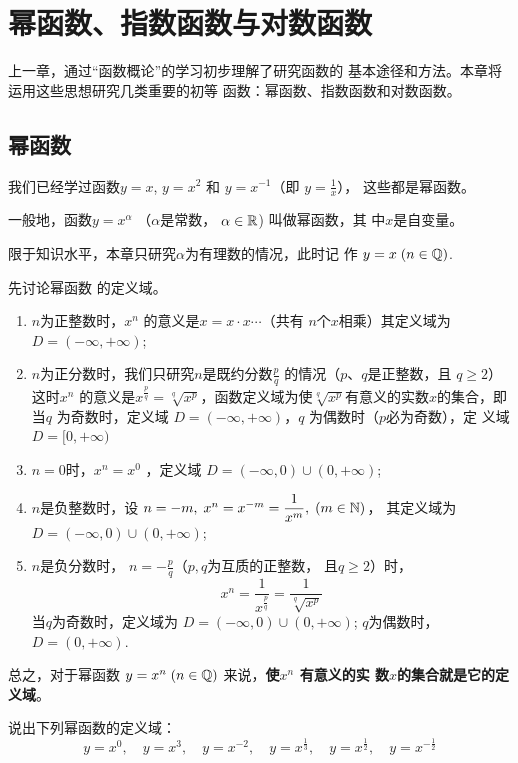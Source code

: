 \chapter{幂函数、指数函数与对数函数}
上一章，通过“函数概论”的学习初步理解了研究函数的
基本途径和方法。本章将运用这些思想研究几类重要的初等
函数：幂函数、指数函数和对数函数。

\section{幂函数}
我们已经学过函数$y=x$, 
$y=x^2$
和
$y=x^{-1}$（即
$y=\frac{1}{x}$），
这些都是幂函数。

一般地，函数$y=x^{\alpha}$
（$\alpha$是常数，
$\alpha\in\mathbb{R}$)
叫做幂函数，其
中$x$是自变量。

限于知识水平，本章只研究$\alpha$为有理数的情况，此时记
作
$y=x\; (n\in \mathbb{Q})$.

先讨论幂函数
的定义域。

\begin{enumerate}[(1)]
    \item $n$为正整数时，$x^n$
的意义是$x=x\cdot x\cdots$（共有
$n$个$x$相乘）其定义域为
$D=(-\infty,+\infty)$;
\item $n$为正分数时，我们只研究$n$是既约分数$\frac{p}{q}$
的情况（$p$、$q$是正整数，且
$q\ge 2$）这时$x^n$
的意义是$x^{\tfrac{p}{q}}=\sqrt[q]{x^p}$，函数定义域为使$\sqrt[q]{x^p}$有意义的实数$x$的集合，即当$q$
为奇数时，定义域
$D=(-\infty,+\infty)$，$q$
为偶数时（$p$必为奇数），定
义域
$D=[0,+\infty)$
\item $n=0$时，$x^n=x^0$
，定义域
$D=(-\infty,0)\cup (0,+\infty)$;
\item $n$是负整数时，设
$n=-m,\; x^n=x^{-m}=\dfrac{1}{x^m},\; (m\in\mathbb{N})$，
其定义域为$D=(-\infty,0)\cup (0,+\infty)$;
\item $n$是负分数时，
$n=-\frac{p}{q}$（$p,q$为互质的正整数，
且$q\ge 2$）时，
\[x^n=\frac{1}{x^{\tfrac{p}{q}}}=\frac{1}{\sqrt[q]{x^p}}\]
当$q$为奇数时，定义域为
$D=(-\infty,0)\cup (0,+\infty)$; $q$为偶数时，
$D=(0,+\infty)$.

\end{enumerate}

总之，对于幂函数
$y=x^n\; (n\in\mathbb{Q})$
来说，\textbf{使$x^n$
有意义的实
数$x$的集合就是它的定义域}。

\begin{example}
    说出下列幂函数的定义域：
\[y=x^0,\quad y=x^3,\quad y=x^{-2},\quad y=x^{\tfrac{1}{3}},\quad y=x^{\tfrac{1}{2}},\quad y=x^{-\tfrac{1}{2}}\]
\end{example}

